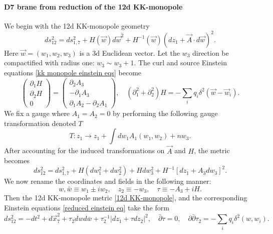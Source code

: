 \paragraph{D7 brane from reduction of the 12d KK-monopole}
We begin with the 12d KK-monopole geometry
\begin{equation}
ds_{12}^2 = ds_{1,7}^2 + H(\vec{w})d\vec{w}^2 + H^{-1}(\vec{w})(dz_1 + \vec{A}\cdot d\vec{w})^2.
\label{12d KK-monopole}
\end{equation}
Here $\vec{w} = (w_1, w_2, w_3)$ is a 3d Euclidean vector.
Let the $w_3$ direction be compactified with radius one: $w_3\sim w_3 + 1$.
The curl and source Einstein equations \eqref{kk monopole einstein eqs} become
\begin{equation}
\begin{pmatrix}
\partial_1 H\\
\partial_2 H\\0
\end{pmatrix}
=\begin{pmatrix}\partial_2 A_3\\
-\partial_1 A_3\\
\partial_1 A_2-\partial_2 A_1
\end{pmatrix},\quad
(\partial_1^2+\partial_2^2)H=-\sum_i q_i \delta^2(\vec{w}-\vec{w}_i).
\label{reduced einstein eq}
\end{equation}
We fix a gauge where $A_1=A_2=0$ by performing the following gauge transformation denoted $T$
\begin{equation}
T:z_1\to z_1+\int dw_1 A_1 (w_1,w_2)+n w_3.
\label{T gauge transformation}
\end{equation}
After accounting for the induced transformations on $\vec{A}$ and $H$, the metric becomes
\begin{equation}
ds_{12}^2 = ds_{1,7}^2 + H(dw_1^2 + dw_2^2) + H dw_3^2 + H^{-1}[dz_1 + A_3 dw_3]^2.
\end{equation}
We now rename the coordinates and fields in the following manner:
\begin{equation}w,\bar w\equiv w_1\pm i w_2,\quad
z_2\equiv - w_3,\quad
\tau \equiv -A_3 + i H.
\end{equation}
Then the 12d KK-monopole metric \eqref{12d KK-monopole}, and the corresponding Einstein equations \eqref{reduced einstein eq} take the form
\begin{equation}
ds_{12}^2 = -dt^2 + d\vec{x}_7^2 + \tau_2 dw d\bar w + \tau_2^{-1}|dz_1 + \tau dz_2|^2,\quad
\bar\partial \tau = 0,\quad
\partial\bar\partial \tau_2 = -\sum_i q_i \delta^2(w,w_i).
\label{12d KK-monopole in complex coordinates}
\end{equation}

